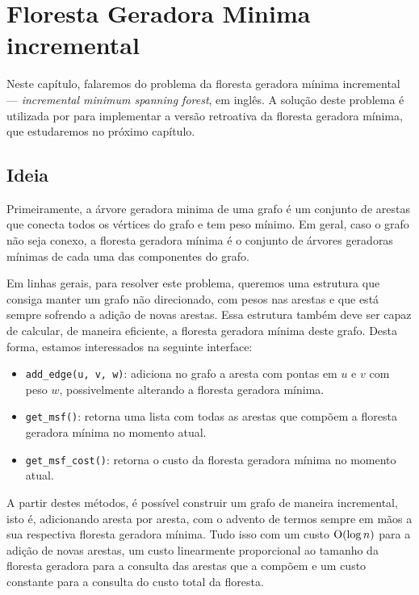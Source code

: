 
\chapter{Floresta Geradora Minima incremental}
\label{cap:incremental-msf}

Neste capítulo, falaremos do problema da floresta geradora mínima incremental --- \emph{incremental minimum spanning forest}, em inglês. A solução deste problema é utilizada por \citet{10.1093/comjnl/bxaa135} para implementar a versão retroativa da floresta geradora mínima, que estudaremos no próximo capítulo.

\section{Ideia}
\label{sec:imsf-ideia}

Primeiramente, a árvore geradora minima de uma grafo é um conjunto de arestas que conecta todos os vértices do grafo e tem peso mínimo. Em geral, caso o grafo não seja conexo, a floresta geradora mínima é o conjunto de árvores geradoras mínimas de cada uma das componentes do grafo.

Em linhas gerais, para resolver este problema, queremos uma estrutura que consiga manter um grafo não direcionado, com pesos nas arestas e que está sempre sofrendo a adição de novas arestas. Essa estrutura também deve ser capaz de calcular, de maneira eficiente, a floresta geradora mínima deste grafo. Desta forma, estamos interessados na seguinte interface:

\begin{itemize}
    \item \texttt{add\_edge(u, v, w)}: adiciona no grafo a aresta com pontas em $u$ e $v$ com peso $w$, possivelmente alterando a floresta geradora mínima.
    \item \texttt{get\_msf()}: retorna uma lista com todas as arestas que compõem a floresta geradora mínima no momento atual.
    \item \texttt{get\_msf\_cost()}: retorna o custo da floresta geradora mínima no momento atual.
\end{itemize}

A partir destes métodos, é possível construir um grafo de maneira incremental, isto é, adicionando aresta por aresta, com o advento de termos sempre em mãos a sua respectiva floresta geradora mínima. Tudo isso com um custo $\mathrm{O} (\log n)$ para a adição de novas arestas, um custo linearmente proporcional ao tamanho da floresta geradora para a consulta das arestas que a compõem e um custo constante para a consulta do custo total da floresta.

